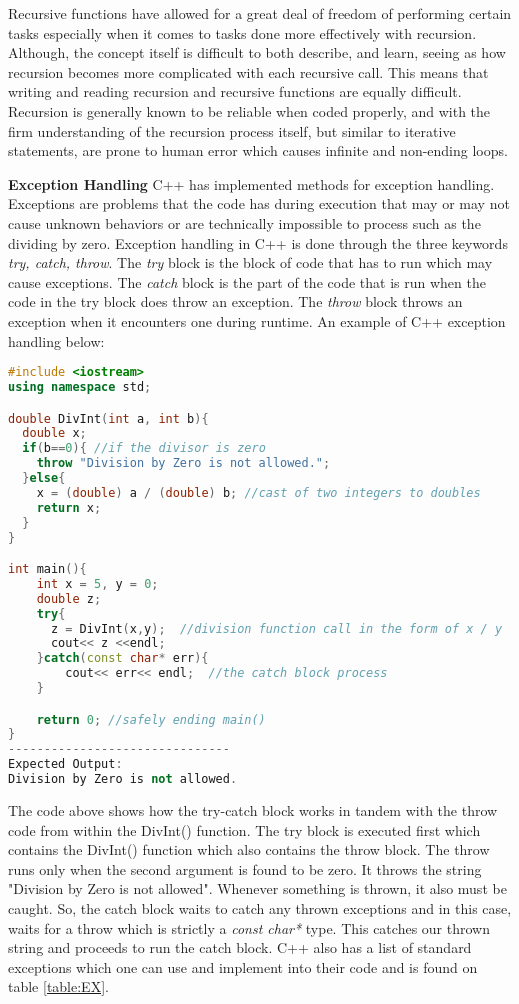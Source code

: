 \documentclass[12pt]{article}
\begin{document}
Recursive functions have allowed for a great deal of freedom of performing certain tasks especially when it comes to tasks done more effectively with recursion. Although, the concept itself is difficult to both describe, and learn, seeing as how recursion becomes more complicated with each recursive call. This means that writing and reading recursion and recursive functions are equally difficult. Recursion is generally known to be reliable when coded properly, and with the firm understanding of the recursion process itself, but similar to iterative statements, are prone to human error which causes infinite and non-ending loops. 

\textbf{Exception Handling} C++ has implemented methods for exception handling. Exceptions are problems that the code has during execution that may or may not cause unknown behaviors or are technically impossible to process such as the dividing by zero. Exception handling in C++ is done through the three keywords \textit{try, catch, throw}. The \textit{try} block is the block of code that has to run which may cause exceptions. The \textit{catch} block is the part of the code that is run when the code in the try block does throw an exception. The \textit{throw} block throws an exception when it encounters one during runtime. An example of C++ exception handling below:

\begin{lstlisting}[language = C++]
#include <iostream>
using namespace std;

double DivInt(int a, int b){
  double x;
  if(b==0){ //if the divisor is zero
    throw "Division by Zero is not allowed.";
  }else{
    x = (double) a / (double) b; //cast of two integers to doubles
    return x;
  }
}

int main(){
    int x = 5, y = 0;
    double z;
    try{
      z = DivInt(x,y);  //division function call in the form of x / y
      cout<< z <<endl; 
    }catch(const char* err){
        cout<< err<< endl;  //the catch block process
    }

    return 0; //safely ending main()
}
-------------------------------
Expected Output:
Division by Zero is not allowed.
\end{lstlisting}

The code above shows how the try-catch block works in tandem with the throw code from within the DivInt() function. The try block is executed first which contains the DivInt() function which also contains the throw block. The throw runs only when the second argument is found to be zero. It throws the string "Division by Zero is not allowed". Whenever something is thrown, it also must be caught. So, the catch block waits to catch any thrown exceptions and in this case, waits for a throw which is strictly a \textit{const char* } type. This catches our thrown string and proceeds to run the catch block. C++ also has a list of standard exceptions which one can use and implement into their code and is found on table \ref{table:EX}.
\end{document}
